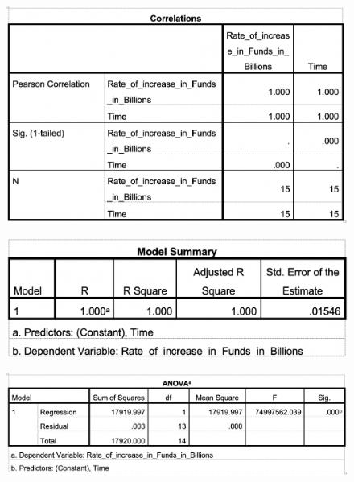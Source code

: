 \documentclass[11pt, journal,letterpaper,compsoc]{IEEEtran}
\begin{document}
\begin{figure}  [h!]
\includegraphics[width=\linewidth]{images/correlations}
\end{figure}

\begin{figure}  [h!]
\includegraphics[width=\linewidth]{images/model-summary}
\end{figure}

\begin{figure}  [h!]
\includegraphics[width=\linewidth]{images/anova}
\end{figure}
\end{document}
